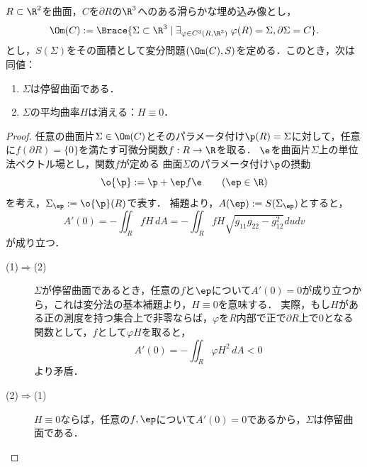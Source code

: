 \documentclass[uplatex,dvipdfmx]{jsarticle}
\begin{document}
\begin{exercise}
    $R\subset\R^2$を曲面，$C$を$\partial R$の$\R^3$へのある滑らかな埋め込み像とし，
    \[\Om(C):=\Brace{\Sigma\subset\R^3\mid\exists_{\varphi\in C^3(R,\R^3)}\;\varphi(R)=\Sigma,\partial\Sigma=C}.\]
    とし，$S(\Sigma)$をその面積として変分問題$(\Om(C),S)$を定める．このとき，次は同値：
    \begin{enumerate}
        \item $\Sigma$は停留曲面である．
        \item $\Sigma$の平均曲率$H$は消える：$H\equiv0$．
    \end{enumerate}
\end{exercise}
\begin{proof}
    任意の曲面片$\Sigma\in\Om(C)$とそのパラメータ付け$\p(R)=\Sigma$に対して，任意に$f(\partial R)=\{0\}$を満たす可微分関数$f:R\to\R$を取る．
    $\e$を曲面片$\Sigma$上の単位法ベクトル場とし，関数$f$が定める
    曲面$\Sigma$のパラメータ付け$\p$の摂動
    \[\o{\p}:=\p+\ep f\e\qquad(\ep\in\R)\]
    を考え，$\Sigma_\ep:=\o{\p}(R)$で表す．
    補題より，$A(\ep):=S(\Sigma_\ep)$とすると，
    \[A'(0)=-\iint_RfH\,dA=-\iint_RfH\sqrt{g_{11}g_{22}-g_{12}^2}dudv\]
    が成り立つ．
    \begin{description}
        \item[(1)$\Rightarrow$(2)] $\Sigma$が停留曲面であるとき，任意の$f$と$\ep$について$A'(0)=0$が成り立つから，これは変分法の基本補題より，$H\equiv0$を意味する．
        実際，もし$H$がある正の測度を持つ集合上で非零ならば，$\varphi$を$R$内部で正で$\partial R$上で$0$となる関数として，$f$として$\varphi H$を取ると，
        \[A'(0)=-\iint_R\varphi H^2\,dA<0\]
        より矛盾．
        \item[(2)$\Rightarrow$(1)] $H\equiv0$ならば，任意の$f,\ep$について$A'(0)=0$であるから，$\Sigma$は停留曲面である．
    \end{description}
\end{proof}
\end{document}
